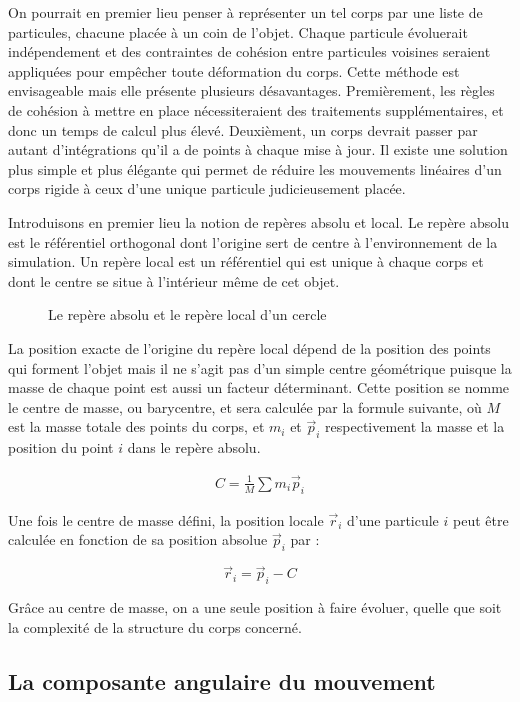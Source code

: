 On pourrait en premier lieu penser à représenter un tel corps par une
liste de particules, chacune placée à un coin de l'objet. Chaque
particule évoluerait indépendement et des contraintes de cohésion
entre particules voisines seraient appliquées pour empêcher toute
déformation du corps. Cette méthode est envisageable mais elle
présente plusieurs désavantages. Premièrement, les règles de cohésion
à mettre en place nécessiteraient des traitements supplémentaires, et
donc un temps de calcul plus élevé. Deuxièment, un corps devrait
passer par autant d'intégrations qu'il a de points à chaque mise à
jour. Il existe une solution plus simple et plus élégante qui permet
de réduire les mouvements linéaires d'un corps rigide à ceux d'une
unique particule judicieusement placée.

Introduisons en premier lieu la notion de repères absolu et local. Le
repère absolu est le référentiel orthogonal dont l'origine sert de
centre à l'environnement de la simulation. Un repère local est un
référentiel qui est unique à chaque corps et dont le centre se situe à
l'intérieur même de cet objet.

\begin{figure}
  
  \caption{Le repère absolu et le repère local d'un cercle}
\end{figure}

La position exacte de l'origine du repère local dépend de la position
des points qui forment l'objet mais il ne s'agit pas d'un simple
centre géométrique puisque la masse de chaque point est aussi un
facteur déterminant. Cette position se nomme le centre de masse, ou
barycentre, et sera calculée par la formule suivante, o\`u $M$ est la
masse totale des points du corps, et $m_i$ et $\vec{p}_i$
respectivement la masse et la position du point $i$ dans le repère
absolu.

\begin{align*}
  C = \frac{1}{M} \sum m_i \vec{p}_i
\end{align*}

Une fois le centre de masse défini, la position locale $\vec{r}_i$
d'une particule $i$ peut être calculée en fonction de sa position
absolue $\vec{p}_i$ par :

\[\vec{r}_i = \vec{p}_i - C\]

Grâce au centre de masse, on a une seule position à faire évoluer,
quelle que soit la complexité de la structure du corps concerné.

\subsection{La composante angulaire du mouvement}

